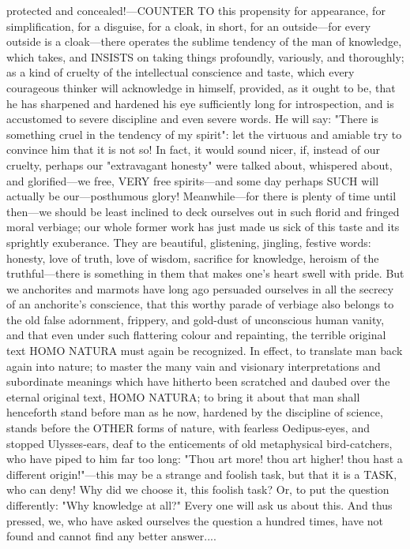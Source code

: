 \documentclass[12pt]{article}
\begin{document}
protected and concealed!---COUNTER TO this propensity for appearance, for simplification, for a disguise, for a cloak, in short, for an outside---for every outside is a cloak---there operates the sublime tendency of the man of knowledge, which takes, and INSISTS on taking things profoundly, variously, and thoroughly; as a kind of cruelty of the intellectual conscience and taste, which every courageous thinker will acknowledge in himself, provided, as it ought to be, that he has sharpened and hardened his eye sufficiently long for introspection, and is accustomed to severe discipline and even severe words. He will say: "There is something cruel in the tendency of my spirit": let the virtuous and amiable try to convince him that it is not so! In fact, it would sound nicer, if, instead of our cruelty, perhaps our "extravagant honesty" were talked about, whispered about, and glorified---we free, VERY free spirits---and some day perhaps SUCH will actually be our---posthumous glory! Meanwhile---for there is plenty of time until then---we should be least inclined to deck ourselves out in such florid and fringed moral verbiage; our whole former work has just made us sick of this taste and its sprightly exuberance. They are beautiful, glistening, jingling, festive words: honesty, love of truth, love of wisdom, sacrifice for knowledge, heroism of the truthful---there is something in them that makes one's heart swell with pride. But we anchorites and marmots have long ago persuaded ourselves in all the secrecy of an anchorite's conscience, that this worthy parade of verbiage also belongs to the old false adornment, frippery, and gold-dust of unconscious human vanity, and that even under such flattering colour and repainting, the terrible original text HOMO NATURA must again be recognized. In effect, to translate man back again into nature; to master the many vain and visionary interpretations and subordinate meanings which have hitherto been scratched and daubed over the eternal original text, HOMO NATURA; to bring it about that man shall henceforth stand before man as he now, hardened by the discipline of science, stands before the OTHER forms of nature, with fearless Oedipus-eyes, and stopped Ulysses-ears, deaf to the enticements of old metaphysical bird-catchers, who have piped to him far too long: "Thou art more! thou art higher! thou hast a different origin!"---this may be a strange and foolish task, but that it is a TASK, who can deny! Why did we choose it, this foolish task? Or, to put the question differently: "Why knowledge at all?" Every one will ask us about this. And thus pressed, we, who have asked ourselves the question a hundred times, have not found and cannot find any better answer....
\end{document}
